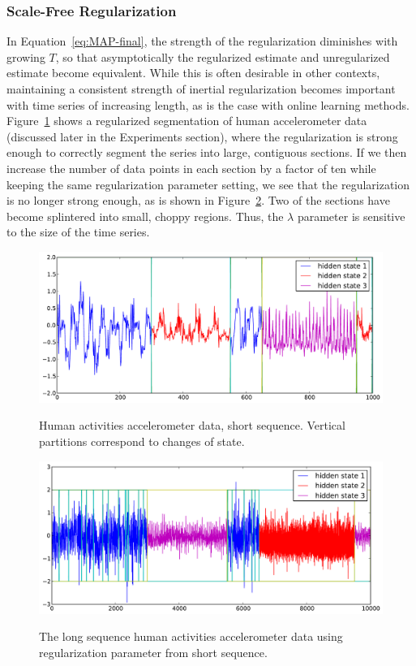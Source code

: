 \documentclass[letterpaper]{article}
\begin{document}
\subsubsection{Scale-Free Regularization}

In Equation~\ref{eq:MAP-final}, the strength of the regularization diminishes
with growing $T$, so that asymptotically the regularized estimate and
unregularized estimate become equivalent. While this is often desirable in other
contexts, maintaining a consistent strength of inertial regularization becomes
important with time series of increasing length, as is the case with online
learning methods. Figure~\ref{fig:short-real-data} shows a regularized
segmentation of human accelerometer data (discussed later in the Experiments
section), where the regularization is strong enough to correctly segment the
series into large, contiguous sections. If we then increase the number of data
points in each section by a factor of ten while keeping the same regularization
parameter setting, we see that the regularization is no longer strong enough, as
is shown in Figure~\ref{fig:long-real-data}. Two of the sections have become
splintered into small, choppy regions. Thus, the $\lambda$ parameter is
sensitive to the size of the time series.
\begin{figure}[htbp]
  \centering
    \includegraphics[width=0.8\linewidth]{images/MAP_results_hard_activity_short_3_states.pdf}
    \label{fig:short-real-data}
  \caption{\small{Human activities accelerometer data, short sequence. Vertical
  partitions correspond to changes of state.}}
\end{figure}

\begin{figure}[htbp]
  \centering
    \includegraphics[width=0.8\linewidth]{images/MAP_results_hard_activity_long_3_states.pdf}
    \label{fig:long-real-data}
  \caption{\small{The long sequence human activities accelerometer data using
  regularization parameter from short sequence.}}
\end{figure}
\end{document}
